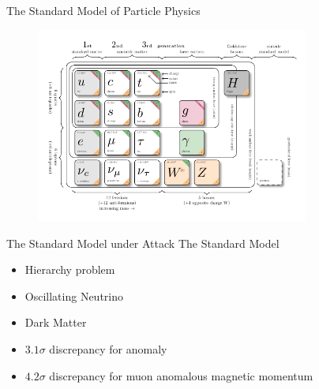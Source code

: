 \begin{frame}[fragile]{The Standard Model of Particle Physics}
  \begin{figure}[htpb]
    \centering
    \includegraphics[width=0.8\textwidth]{fig/standard-model.pdf}
  \end{figure}
\end{frame}

\begin{frame}[fragile]{The Standard Model under Attack}
  The Standard Model 
  \begin{itemize}
    \item Hierarchy problem
    \item Oscillating Neutrino
    \item Dark Matter
    \item \(3.1 \sigma\) discrepancy for \PQb anomaly
    \item \(4.2\sigma\) discrepancy for muon anomalous magnetic momentum
  \end{itemize}
\end{frame}

